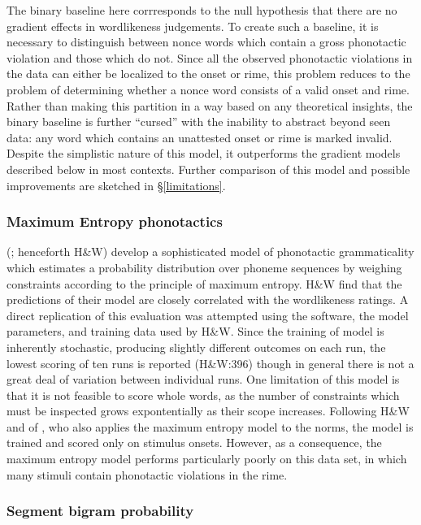 The binary baseline here corrresponds to the null hypothesis that there are no gradient effects in wordlikeness judgements. To create such a baseline, it is necessary to distinguish between nonce words which contain a gross phonotactic violation and those which do not. Since all the observed phonotactic violations in the data can either be localized to the onset or rime, this problem reduces to the problem of determining whether a nonce word consists of a valid onset and rime. Rather than making this partition in a way based on any theoretical insights, the binary baseline is further ``cursed'' with the inability to abstract beyond seen data: any word which contains an unattested onset or rime is marked invalid. Despite the simplistic nature of this model, it outperforms the gradient models described below in most contexts. Further comparison of this model and possible improvements are sketched in \S\ref{limitations}.

\subsubsection{Maximum Entropy phonotactics}

\citeauthor{Hayes2008a} (\citeyear{Hayes2008a}; henceforth H\&W) develop a sophisticated model of phonotactic grammaticality which estimates a probability distribution over phoneme sequences by weighing constraints according to the principle of maximum entropy. H\&W find that the predictions of their model are closely correlated with the \citet{Scholes1966} wordlikeness ratings. A direct replication of this evaluation was attempted using the software, the model parameters, and training data used by H\&W. Since the training of model is inherently stochastic, producing slightly different outcomes on each run, the lowest scoring of ten runs is reported (H\&W:396) though in general there is not a great deal of variation between individual runs. One limitation of this model is that it is not feasible to score whole words, as the number of constraints which must be inspected grows expontentially as their scope increases. Following H\&W and of \citet{Albright2009a}, who also applies the maximum entropy model to the \citet{Albright2003b} norms, the model is trained and scored only on stimulus onsets. However, as a consequence, the maximum entropy model performs particularly poorly on this data set, in which many stimuli contain phonotactic violations in the rime.

\subsubsection{Segment bigram probability}

